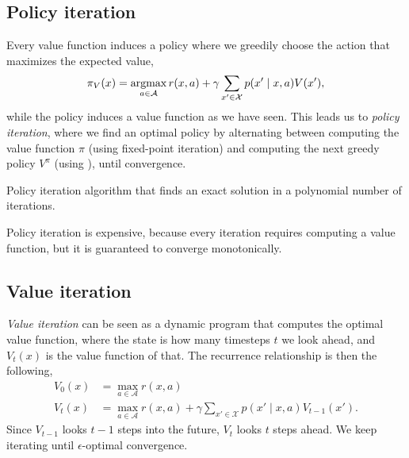 \subsection{Policy iteration}

Every value function induces a policy where we greedily choose the action that
maximizes the expected value,
\begin{equation}
  \pi_V(x) = \argmax_{a\in\mathcal{A}} r(x,a) + \gamma \sum_{x'\in\mathcal{X}} p(x'\mid x,a) V(x')
  \label{eq:greedy-policy}
,\end{equation}
while the policy induces a value function as we have seen. This leads us to
\textit{policy iteration}, where we find an optimal policy by alternating
between computing the value function \wrt $\pi$ (using fixed-point iteration)
and computing the next greedy policy \wrt $V^\pi$ (using
), until convergence.

\begin{algorithm}[h]
  \caption{Policy iteration algorithm that finds an exact solution in a
  polynomial number of iterations.}
  \label{alg:policy-iteration}
  \begin{algorithmic}
      \EndWhile
      \State {\Return $\pi$}
    \EndFunction
  \end{algorithmic}
\end{algorithm}

Policy iteration is expensive, because every iteration requires computing a
value function, but it is guaranteed to converge monotonically.

\subsection{Value iteration}

\textit{Value iteration} can be seen as a dynamic program that computes the
optimal value function, where the state is how many timesteps $t$ we look
ahead, and $V_t(x)$ is the value function of that. The recurrence relationship
is then the following,
\begin{align*}
  V_0(x) &= \max_{a\in\mathcal{A}} r(x,a) \\
  V_t(x) &= \max_{a\in\mathcal{A}} r(x, a) + \gamma \sum_{x'\in\mathcal{X}} p(x'\mid x,a) V_{t-1}(x')
.\end{align*}
Since $V_{t-1}$ looks $t-1$ steps into the future, $V_t$ looks $t$ steps ahead.
We keep iterating until $\epsilon$-optimal
convergence.

